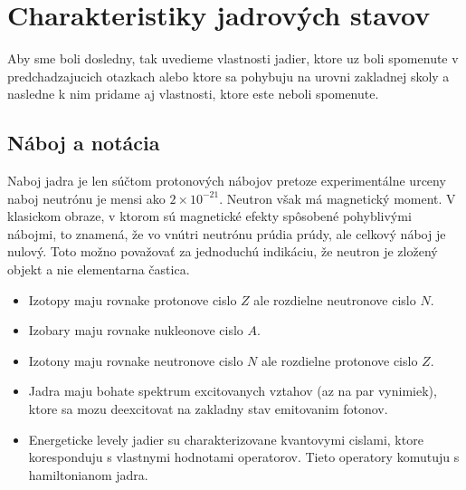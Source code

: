 \documentclass[../../main.tex]{subfiles}
\begin{document}
\chapter{Charakteristiky jadrových stavov}
Aby sme boli dosledny, tak uvedieme vlastnosti jadier, ktore uz boli spomenute v predchadzajucich otazkach alebo ktore sa pohybuju na urovni zakladnej skoly a nasledne k nim pridame aj vlastnosti, ktore este neboli spomenute.
\section{Náboj a notácia}
Naboj jadra je len súčtom protonových nábojov pretoze experimentálne urceny naboj neutrónu je mensi ako $2\times 10^{-21}$. Neutron však má magnetický moment. V klasickom obraze, v ktorom sú magnetické efekty spôsobené pohyblivými nábojmi, to znamená, že vo vnútri neutrónu prúdia prúdy, ale celkový náboj je nulový. Toto možno považovať za jednoduchú indikáciu, že neutron je zložený objekt a nie elementarna častica.
\begin{itemize}
	\item Izotopy maju rovnake protonove cislo $Z$ ale rozdielne neutronove cislo $N$.
	\item Izobary maju rovnake nukleonove cislo $A$.
	\item Izotony maju rovnake neutronove cislo $N$ ale rozdielne protonove cislo $Z$.
	\item Jadra maju bohate spektrum excitovanych vztahov (az na par vynimiek), ktore sa mozu deexcitovat na zakladny stav emitovanim fotonov.
	\item Energeticke levely jadier su charakterizovane kvantovymi cislami, ktore koresponduju s vlastnymi hodnotami operatorov. Tieto operatory komutuju s hamiltonianom jadra.
\end{itemize}
\end{document}
